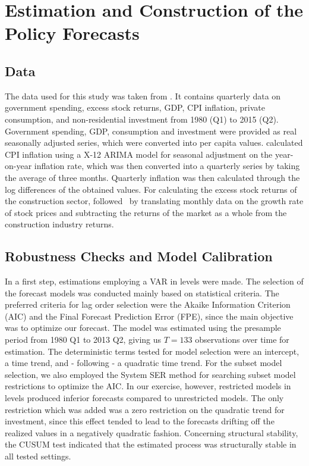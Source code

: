 
\section{Estimation and Construction of the Policy Forecasts}
\label{sec:method}

\subsection{Data}
The data used for this study was taken from \citet{morita2017}. It contains quarterly data on government spending, excess stock returns, GDP, CPI inflation, private consumption, and non-residential investment from 1980 (Q1) to 2015 (Q2). Government spending, GDP, consumption and investment were provided as real seasonally adjusted series, which were converted into per capita values. \citeauthor{morita2017} calculated CPI inflation using a X-12 ARIMA model for seasonal adjustment on the year-on-year inflation rate, which was then converted into a quarterly series by taking the average of three months. Quarterly inflation was then calculated through the log differences of the obtained values. For calculating the excess stock returns of the construction sector, \citeauthor{morita2017} followed~\citet{fisher2010} by translating monthly data on the growth rate of stock prices and subtracting the returns of the market as a whole from the construction industry returns.

\subsection{Robustness Checks and Model Calibration}

In a first step, estimations employing a VAR in levels were made. The selection of the forecast models was conducted mainly based on statistical criteria. The preferred criteria for lag order selection were the Akaike Information Criterion (AIC) and the Final Forecast Prediction Error (FPE), since the main objective was to optimize our forecast. The model was estimated using the presample period from 1980 Q1 to 2013 Q2, giving us $T=133$ observations over time for estimation. The deterministic terms tested for model selection were an intercept, a time trend, and - following \cite{morita2017} - a quadratic time trend. For the subset model selection, we also employed the System SER method for searching subset model restrictions to optimize the AIC. In our exercise, however, restricted models in levels produced inferior forecasts compared to unrestricted models. The only restriction which was added was a zero restriction on the quadratic trend for investment, since this effect tended to lead to the forecasts drifting off the realized values in a negatively quadratic fashion. Concerning structural stability, the CUSUM test indicated that the estimated process was structurally stable in all tested settings.

